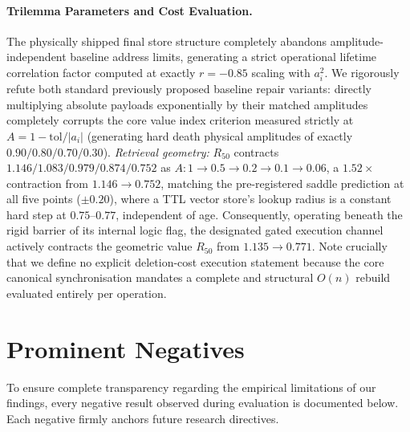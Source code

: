 \documentclass{article}
\begin{document}
\paragraph{Trilemma Parameters and Cost Evaluation.} The physically shipped final store structure completely abandons amplitude-independent baseline address limits, generating a strict operational lifetime correlation factor computed at exactly $r=-0.85$ scaling with $a_i^2$. We rigorously refute both standard previously proposed baseline repair variants: directly multiplying absolute payloads exponentially by their matched amplitudes completely corrupts the core value index criterion measured strictly at $A=1-\text{tol}/|a_i|$ (generating hard death physical amplitudes of exactly $0.90/0.80/0.70/0.30$). \emph{Retrieval geometry:} $R_{50}$ contracts $1.146/1.083/0.979/0.874/0.752$ as $A:1\to0.5\to0.2\to0.1\to0.06$, a $1.52\times$ contraction from $1.146\to0.752$, matching the pre-registered saddle prediction at all five points ($\pm0.20$), where a TTL vector store's lookup radius is a constant hard step at $0.75$--$0.77$, independent of age. Consequently, operating beneath the rigid barrier of its internal logic flag, the designated gated execution channel actively contracts the geometric value $R_{50}$ from $1.135\to0.771$. Note crucially that we define no explicit deletion-cost execution statement because the core canonical synchronisation mandates a complete and structural $O(n)$ rebuild evaluated entirely per operation.

\section{Prominent Negatives}\label{app:negatives}

To ensure complete transparency regarding the empirical limitations of our findings, every negative result observed during evaluation is documented below. Each negative firmly anchors future research directives.
\end{document}
